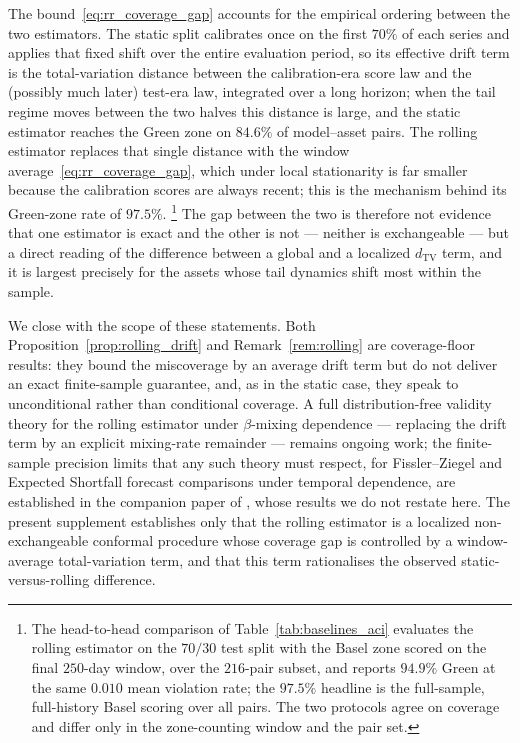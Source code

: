 \documentclass[11pt]{article}
\newcommand{\1}{\boldsymbol{1}}
\newcommand{\dTV}{d_{\mathrm{TV}}}
\begin{document}
The bound~\eqref{eq:rr_coverage_gap} accounts for the empirical ordering
between the two estimators. The static split calibrates once on the first
$70\%$ of each series and applies that fixed shift over the entire evaluation
period, so its effective drift term is the total-variation distance between the
calibration-era score law and the (possibly much later) test-era law, integrated
over a long horizon; when the tail regime moves between the two halves this
distance is large, and the static estimator reaches the Green zone on
$84.6\%$ of model--asset pairs. The rolling estimator replaces that single
distance with the window average~\eqref{eq:rr_coverage_gap}, which under local
stationarity is far smaller because the calibration scores are always recent;
this is the mechanism behind its Green-zone rate of $97.5\%$.%
\footnote{The head-to-head comparison of Table~\ref{tab:baselines_aci}
evaluates the rolling estimator on the $70/30$ test split with the Basel zone
scored on the final $250$-day window, over the $216$-pair subset, and reports
$94.9\%$ Green at the same $0.010$ mean violation rate; the $97.5\%$ headline is
the full-sample, full-history Basel scoring over all pairs. The two protocols
agree on coverage and differ only in the zone-counting window and the pair
set.} The gap between
the two is therefore not evidence that one estimator is exact and the other is
not --- neither is exchangeable --- but a direct reading of the difference
between a global and a localized $\dTV$ term, and it is largest precisely for
the assets whose tail dynamics shift most within the sample.

We close with the scope of these statements. Both
Proposition~\ref{prop:rolling_drift} and Remark~\ref{rem:rolling} are
coverage-floor results: they bound the miscoverage by an average drift term but
do not deliver an exact finite-sample guarantee, and, as in the static case,
they speak to unconditional rather than conditional coverage. A full
distribution-free validity theory for the rolling estimator under
$\beta$-mixing dependence --- replacing the drift term by an explicit mixing-rate
remainder --- remains ongoing work; the finite-sample precision limits that any
such theory must respect, for Fissler--Ziegel and Expected Shortfall forecast
comparisons under temporal dependence, are established in the companion paper of
\citet{pele2026fzminimax}, whose results we do not restate here.
The present supplement establishes only that the rolling
estimator is a localized non-exchangeable conformal procedure whose coverage
gap is controlled by a window-average total-variation term, and that this term
rationalises the observed static-versus-rolling difference.
\end{document}
